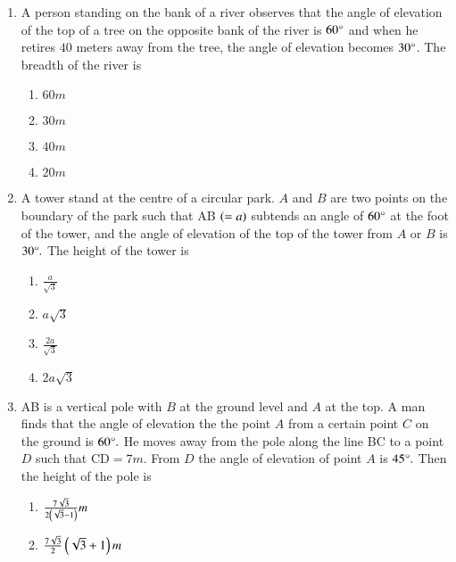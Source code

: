 \begin{enumerate}[label=\thesubsection.\arabic*,ref=\thesubsection.\theenumi]
\item A person standing on the bank of a river observes that the angle of elevation of the top of a tree on the opposite bank of the river is $60\degree$ and when he retires $40$ meters away from the tree, the angle of elevation becomes $30\degree$. The breadth of the river is 
%

\hfill{}
\begin{multicols}{4}
\begin{enumerate}
        \item $60m$                    
        \item $30m$ 
        \item $40m$ 
        \item $20m$
\end{enumerate}
\end{multicols} 
%
\item A tower stand at the centre of a circular park. ${A}$ and ${B}$ are two points on the boundary of the park such that AB $\left(=a\right)$ subtends an angle of $60\degree$ at the foot of the tower, and the angle of elevation of the top of the tower from ${A}$ or ${B}$ is $30\degree.$ The height of the tower is \hfill{}
\begin{multicols}{4}
\begin{enumerate}
        \item $\frac{a}{\sqrt{3}}$                    
        \item $a\sqrt{3}$ 
        \item $\frac{2a}{\sqrt{3}}$ 
        \item $2a\sqrt{3}$
\end{enumerate}
\end{multicols} 
%
\item AB is a vertical pole with ${B}$ at the ground level and ${A}$ at the top. A man finds that the angle of elevation the the point ${A}$ from a certain point ${C}$ on the ground is $60\degree.$ He moves away from the pole along the line BC to a point ${D}$ such that $\text{CD}=7m.$ From ${D}$ the angle of elevation of point ${A}$ is $45\degree.$ Then the height of the pole is  
%
\hfill{}
\begin{multicols}{4}
\begin{enumerate}
	\item $\frac{7\sqrt{3}}{2\left(\sqrt{3}-1\right)}m$
        \item $\frac{7\sqrt{3}}{2}\left(\sqrt{3}+1\right)m$ 

\end{enumerate}
\end{multicols}
\end{enumerate}
